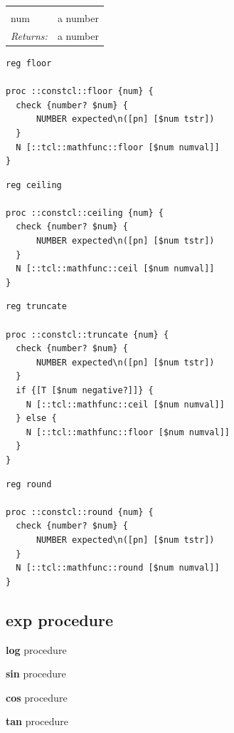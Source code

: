 \documentclass[twoside]{report}
\begin{document}
\noindent\begin{tabular}{ |p{1.9cm} p{8cm}| }
\hline
\rowcolor[HTML]{CCCCCC} \multicolumn{2}{|l|}{\bf floor, ceiling, truncate, round (public)} \\
num & a number \\
\textit{Returns:} & a number \\
\hline
\end{tabular}

\begin{lstlisting}
reg floor

proc ::constcl::floor {num} {
  check {number? $num} {
      NUMBER expected\n([pn] [$num tstr])
  }
  N [::tcl::mathfunc::floor [$num numval]]
}
\end{lstlisting}

\begin{lstlisting}
reg ceiling

proc ::constcl::ceiling {num} {
  check {number? $num} {
      NUMBER expected\n([pn] [$num tstr])
  }
  N [::tcl::mathfunc::ceil [$num numval]]
}
\end{lstlisting}

\begin{lstlisting}
reg truncate

proc ::constcl::truncate {num} {
  check {number? $num} {
      NUMBER expected\n([pn] [$num tstr])
  }
  if {[T [$num negative?]]} {
    N [::tcl::mathfunc::ceil [$num numval]]
  } else {
    N [::tcl::mathfunc::floor [$num numval]]
  }
}
\end{lstlisting}

\begin{lstlisting}
reg round

proc ::constcl::round {num} {
  check {number? $num} {
      NUMBER expected\n([pn] [$num tstr])
  }
  N [::tcl::mathfunc::round [$num numval]]
}
\end{lstlisting}

\subsection{exp procedure}
\label{exp-procedure}

\noindent \textbf{log} procedure

\noindent \textbf{sin} procedure

\noindent \textbf{cos} procedure

\noindent \textbf{tan} procedure
\end{document}
